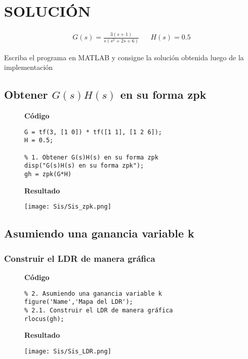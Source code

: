 \section{SOLUCIÓN}

\begin{align*}
    G(s)=\displaystyle \frac{3(s+1)}{s(s^2+2s+6)}&&H(s)=0.5
\end{align*}
    
Escriba el programa en MATLAB y consigne la solución obtenida luego de la implementación
\subsection{Obtener $G(s)H(s)$ en su forma zpk}

\begin{figure}[H]
    \begin{framed}
        \centering
        \begin{minipage}[t]{.45\textwidth}
            \textbf{Código}
            \begin{verbatim}
G = tf(3, [1 0]) * tf([1 1], [1 2 6]);
H = 0.5;

% 1. Obtener G(s)H(s) en su forma zpk
disp("G(s)H(s) en su forma zpk");
gh = zpk(G*H)
            \end{verbatim}
        \end{minipage}
        \quad
        \begin{minipage}[t]{.45\textwidth}
            \textbf{Resultado}
            
            \texttt{[image: Sis/Sis\_zpk.png]}
        \end{minipage}
    \end{framed}
\end{figure}
\newpage
\subsection{Asumiendo una ganancia variable k}

\subsubsection{Construir el LDR de manera gráfica}
\begin{figure}[H]
    \begin{framed}
        \centering
        \begin{minipage}[t]{.45\textwidth}
            \textbf{Código}
            \begin{verbatim}
% 2. Asumiendo una ganancia variable k
figure('Name','Mapa del LDR');
% 2.1. Construir el LDR de manera gráfica
rlocus(gh);
            \end{verbatim}
        \end{minipage}
        \quad
        \begin{minipage}[t]{.45\textwidth}
            \textbf{Resultado}
            
            \texttt{[image: Sis/Sis\_LDR.png]}
        \end{minipage}
    \end{framed}
\end{figure}

